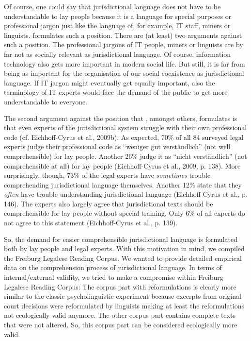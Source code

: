 \documentclass[output=paper]{langsci/langscibook}
\begin{document}
Of course, one could say that jurisdictional language does not have to be understandable to lay people because it is a language for special purposes or professional jargon just like the language of, for example, IT staff, miners or linguists. \citet{Towfigh2009} formulates such a position. There are (at least) two arguments against such a position. The professional jargons of IT people, miners or linguists are by far not as socially relevant as jurisdictional language. Of course, information technology also gets more important in modern social life. But still, it is far from being as important for the organisation of our social coexistence as jurisdictional language. If IT jargon might eventually get equally important, also the terminology of IT experts would face the demand of the public to get more understandable to everyone.

The second argument against the position that \citet{Towfigh2009}, amongst others, formulates is that even experts of the jurisdictional system struggle with their own professional code (cf. Eichhoff-Cyrus et al., 2009b). As expected, 70\% of all 84 surveyed legal experts judge their professional code as “weniger gut verständlich” (not well comprehensible) for lay people. Another 26\% judge it as “nicht verständlich” (not comprehensible at all) for lay people (Eichhoff-Cyrus et al., 2009, p. 138). More surprisingly, though, 73\% of the legal experts have \textit{sometimes} trouble comprehending jurisdictional language themselves. Another 12\% state that they \textit{often} have trouble understanding jurisdictional language (Eichhoff-Cyrus et al., p. 146). The experts also largely agree that jurisdictional texts should be comprehensible for lay people without special training. Only 6\% of all experts do not agree to this statement (Eichhoff-Cyrus et al., p. 139).

So, the demand for easier comprehensible jurisdictional language is formulated both by lay people and legal experts. With this motivation in mind, we compiled the Freiburg Legalese Reading Corpus. We wanted to provide detailed empirical data on the comprehension process of jurisdictional language. In terms of internal/external validity, we tried to make a compromise within Freiburg Legalese Reading Corpus: The corpus part with reformulations is clearly more similar to the classic psycholinguistic experiment because excerpts from original court decisions were reformulated by linguists making at least the reformulations not ecologically valid anymore. The other corpus part contains complete texts that were not altered. So, this corpus part can be considered ecologically more valid.
\end{document}
